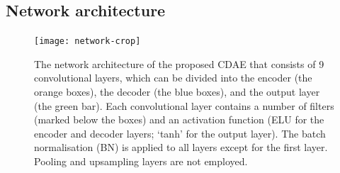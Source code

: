 \documentclass[fleqn,usenatbib]{mnras}
\newcommand{\editwip}[1]{{\leavevmode\color{magenta}#1}}
\begin{document}
\subsection{Network architecture}
\label{sec:architecture}

\begin{figure}
  \centering
  \texttt{[image: network-crop]}
  \caption{\label{fig:network}\editwip{%
    The network architecture of the proposed CDAE that consists of 9
    convolutional layers, which can be divided into the encoder (the orange
    boxes), the decoder (the blue boxes), and the output layer (the green
    bar).
    Each convolutional layer contains a number of filters (marked below the
    boxes) and an activation function (ELU for the encoder and decoder
    layers; `tanh' for the output layer).
    The batch normalisation (BN) is applied to all layers except for the
    first layer.
    Pooling and upsampling layers are not employed.
  }}
\end{figure}
\end{document}
